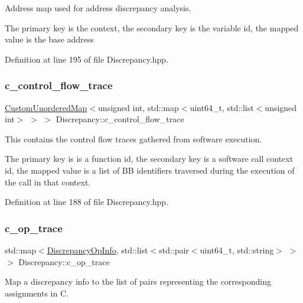 Address map used for address discrepancy analysis. 

The primary key is the context, the secondary key is the variable id, the mapped value is the base address 

Definition at line 195 of file Discrepancy.\+hpp.

\mbox{\label{structDiscrepancy_aba40ab7fce0dd3b52d3c2a7261ec7c29}} 
\subsubsection{\texorpdfstring{c\+\_\+control\+\_\+flow\+\_\+trace}{c\_control\_flow\_trace}}
{\footnotesize\ttfamily \hyperlink{custom__map_8hpp_ad1ed68f2ff093683ab1a33522b144adc}{Custom\+Unordered\+Map}$<$unsigned int, std\+::map$<$uint64\+\_\+t, std\+::list$<$unsigned int$>$ $>$ $>$ Discrepancy\+::c\+\_\+control\+\_\+flow\+\_\+trace}



This contains the control flow traces gathered from software execution. 

The primary key is is a function id, the secondary key is a software call context id, the mapped value is a list of BB identifiers traversed during the execution of the call in that context. 

Definition at line 188 of file Discrepancy.\+hpp.

\mbox{\label{structDiscrepancy_a9906d402084177f51a92df1731fa25ce}} 
\subsubsection{\texorpdfstring{c\+\_\+op\+\_\+trace}{c\_op\_trace}}
{\footnotesize\ttfamily std\+::map$<$\hyperlink{classDiscrepancyOpInfo}{Discrepancy\+Op\+Info}, std\+::list$<$std\+::pair$<$uint64\+\_\+t, std\+::string$>$ $>$ $>$ Discrepancy\+::c\+\_\+op\+\_\+trace}



Map a discrepancy info to the list of pairs representing the corresponding assignments in C. 


